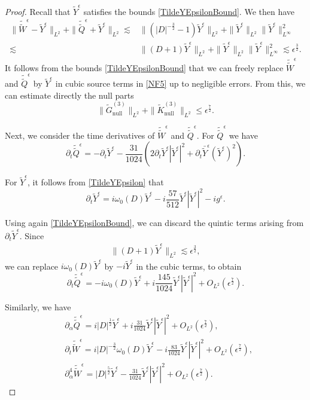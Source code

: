 \documentclass[10pt,a4paper]{amsart}
\newcommand{\al}{\alpha}
\newcommand{\e}{\epsilon}
\newcommand{\f}{\frac}
\begin{document}
\begin{proof}
Recall that $\tilde{Y}^\epsilon$ satisfies the bounds \eqref{TildeYEpsilonBound}. We then have
\begin{align*}
\|\tilde{\tilde{W}}^\epsilon - \tilde{Y}^\epsilon\|_{L^2} + \|\tilde{\tilde{Q}}^\epsilon + \tilde{Y}^\epsilon\|_{L^2}\lesssim& \|(|D|^{-\f32}-1)\tilde{Y}^\epsilon\|_{L^2}+\|\tilde{Y}^\epsilon\|_{L^2}\|\tilde{Y}^\epsilon\|^2_{L^\infty}\\
\lesssim& \|(D+1)\tilde{Y}^\epsilon\|_{L^2}+\|\tilde{Y}^\epsilon\|_{L^2}\|\tilde{Y}^\epsilon\|^2_{L^\infty}\lesssim\e^{\f32}.
\end{align*}
It follows from the bounds \eqref{TildeYEpsilonBound} that we can freely replace $\tilde{\tilde{W}}^\e$ and $\tilde{\tilde{Q}}^\e$ by $\tilde{Y}^\e$ in cubic source terms in \eqref{NF5} up to negligible errors. From this, we can estimate directly the null parts  
\[
\| \tilde{G}_{\text{null}}^{(3)} \|_{L^2} + \| \tilde{K}_{\text{null}}^{(3)} \|_{L^2} \leq \epsilon^{\frac{7}{2}}.
\]

Next, we consider the time derivatives of $\tilde{\tilde{W}}^\e$ and $\tilde{\tilde{Q}}^\e$. For $\tilde{\tilde{Q}}^\e$ we have  
\[
\partial_t \tilde{\tilde{Q}}^\e = -\partial_t \tilde{Y}^\e - \frac{31}{1024} \left(2\partial_t \tilde{Y}^\e |\tilde{Y}^\e|^2 + \partial_t \bar{\tilde{Y}}^\e (\tilde{Y}^\e)^2\right).
\]

For $\tilde{Y}^\e$, it follows from \eqref{TildeYEpsilon} that
\[
\partial_t \tilde{Y}^\e = i\omega_0 (D) \tilde{Y}^\e -i\frac{57}{512} \tilde{Y}^\e|\tilde{Y}^\e|^2 - ig^\e.
\]

Using again \eqref{TildeYEpsilonBound}, we can discard the quintic terms arising from $\partial_t \tilde{Y}^\e$. Since
\begin{align*}
\|(D+1)\tilde{Y}^{\e}\|_{L^2}\lesssim \epsilon^\f32,
\end{align*}
we can replace $i\omega_0 (D) \tilde{Y}^\e$ by $-i \tilde{Y}^\e$ in the cubic terms, to obtain 
\[
\partial_t \tilde{\tilde{Q}}^\e = -i\omega_0 (D) \tilde{Y}^\e + i\frac{145}{1024} \tilde{Y}^\e |\tilde{Y}^\e|^2 + O_{L^2} (\epsilon^{\frac{7}{2}}).
\]

Similarly, we have
\begin{align*}
&\partial_{\al} \tilde{\tilde{Q}}^\e = i |D|^{\frac{1}{2}}\tilde{Y}^\e +i\frac{31}{1024} \tilde{Y}^\e |\tilde{Y}^\e|^2 + O_{L^2} (\epsilon^{\frac{7}{2}}), \\
&\partial_t \tilde{\tilde{W}}^\e = i |D|^{-\frac{3}{2}} \omega_0 (D) \tilde{Y}^\e-i\f{83}{1024}\tilde{Y}^\e |\tilde{Y}^\e|^2 + O_{L^2} (\epsilon^{\frac{7}{2}}), \\
& \partial_\al^4 \tilde{\tilde{W}}^\e = |D|^{\f52} \tilde{Y}^\e - \frac{31}{1024} \tilde{Y}^\e |\tilde{Y}^\e|^2 + O_{L^2} (\epsilon^{\frac{7}{2}}).
\end{align*}


\end{proof}
\end{document}
